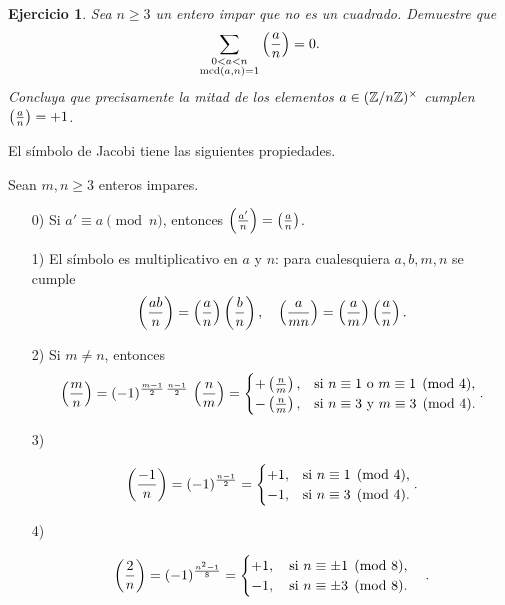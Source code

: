 \documentclass{article}
\theoremstyle{plain}
\newtheorem{ejerc}{Ejercicio}
\begin{document}
\begin{ejerc}
  Sea $n \ge 3$ un entero impar que no es un cuadrado. Demuestre que
  $$\sum_{\substack{0 < a < n \\ \operatorname{mcd} (a,n) = 1}} \left(\frac{a}{n}\right) = 0.$$
  Concluya que precisamente la mitad de los elementos $a \in (\mathbb{Z}/n\mathbb{Z})^\times$
  cumplen $\left(\frac{a}{n}\right) = +1$.
\end{ejerc}

El símbolo de Jacobi tiene las siguientes propiedades.

\begin{proposicion}
  Sean $m, n \ge 3$ enteros impares.

  \begin{enumerate}
  \item[0)] Si $a' \equiv a \pmod{n}$, entonces
    $\left(\frac{a'}{n}\right) = \left(\frac{a}{n}\right)$.

  \item[1)] El símbolo es multiplicativo en $a$ y $n$: para cualesquiera
    $a,b,m,n$ se cumple
    $$\left(\frac{ab}{n}\right) = \left(\frac{a}{n}\right)\left(\frac{b}{n}\right), \quad \left(\frac{a}{mn}\right) = \left(\frac{a}{m}\right)\left(\frac{a}{n}\right).$$

  \item[2)] Si $m \ne n$, entonces
    \[ \left(\frac{m}{n}\right) = (-1)^{\frac{m-1}{2}\,\frac{n-1}{2}}\,\left(\frac{n}{m}\right) = \begin{cases}
        +\left(\frac{n}{m}\right), & \text{si }n\equiv 1\text{ o }m\equiv 1 \pmod{4},\\
        -\left(\frac{n}{m}\right), & \text{si } n\equiv 3\text{ y }m\equiv 3 \pmod{4}.
      \end{cases}. \]
\item[3)]

  \[ \left(\frac{-1}{n}\right) = (-1)^{\frac{n-1}{2}} = \begin{cases}
      +1, & \text{si }n \equiv 1 \pmod{4},\\
      -1, & \text{si }n \equiv 3 \pmod{4}.
\end{cases}. \]

\item[4)]

  \[ \left(\frac{2}{n}\right) = (-1)^{\frac{n^2-1}{8}} = \begin{cases}
      +1, \quad \text{si }n \equiv \pm 1 \pmod{8},\\
      -1, \quad \text{si }n \equiv \pm 3 \pmod{8}.
    \end{cases}. \]
  \end{enumerate}


\end{proposicion}
\end{document}
